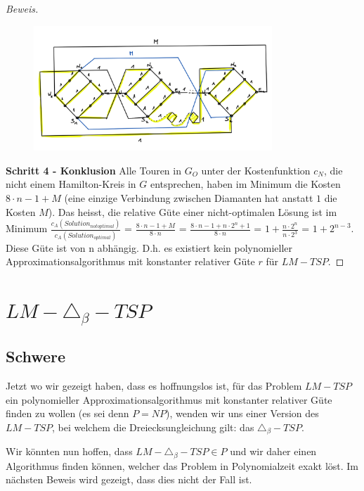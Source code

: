 \documentclass[a4paper,11pt]{scrreprt}
\begin{document}
\begin{proof}[Beweis]
\begin{figure}[H]
\centering
\includegraphics[width=0.8\textwidth]{lm_tsp_hard_new2.png}
\caption{}
\label{fig:lm-tsp-proof-step3}
\end{figure}

\textbf{Schritt 4 - Konklusion} Alle Touren in $G_O$ unter der Kostenfunktion $c_N$, die nicht einem Hamilton-Kreis in $G$ entsprechen, haben im Minimum die Kosten $8 \cdot n - 1 + M$ (eine einzige Verbindung zwischen Diamanten hat anstatt $1$ die Kosten $M$). Das heisst, die relative Güte einer nicht-optimalen Lösung ist im Minimum $\frac{c_A(Solution_{not optimal})}{c_A(Solution_{optimal})}$ = $\frac{8 \cdot n - 1 + M}{8 \cdot n}$ = $\frac{8 \cdot n - 1 + n \cdot 2^n + 1}{8 \cdot n}$ = $1 + \frac{n \cdot 2^n}{n \cdot 2^3}$ = $1 + 2^{n-3}$. Diese Güte ist von n abhängig. D.h. es existiert kein polynomieller Approximationsalgorithmus mit konstanter relativer Güte $r$ für $LM-TSP$.
\end{proof}

\section{$LM-\triangle_\beta-TSP$}

\subsection{Schwere}

Jetzt wo wir gezeigt haben, dass es hoffnungslos ist, für das Problem $LM-TSP$ ein polynomieller Approximationsalgorithmus mit konstanter relativer Güte finden zu wollen (es sei denn $P = NP$), wenden wir uns einer Version des $LM-TSP$, bei welchem die Dreiecksungleichung gilt: das $\triangle_\beta-TSP$. 

Wir könnten nun hoffen, dass $LM-\triangle_\beta-TSP \in P$ und wir daher einen Algorithmus finden können, welcher das Problem in Polynomialzeit exakt löst. Im nächsten Beweis wird gezeigt, dass dies nicht der Fall ist.
\end{document}
